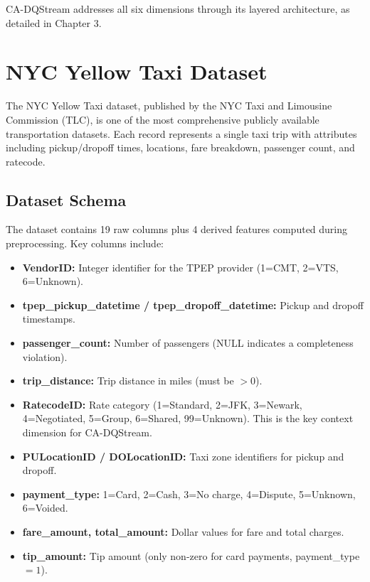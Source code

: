 CA-DQStream addresses all six dimensions through its layered architecture, as detailed in Chapter 3.

\section{NYC Yellow Taxi Dataset}

The NYC Yellow Taxi dataset, published by the NYC Taxi and Limousine Commission (TLC), is one of the most comprehensive publicly available transportation datasets. Each record represents a single taxi trip with attributes including pickup/dropoff times, locations, fare breakdown, passenger count, and ratecode.

\subsection{Dataset Schema}

The dataset contains 19 raw columns plus 4 derived features computed during preprocessing. Key columns include:

\begin{itemize}
    \item \textbf{VendorID:} Integer identifier for the TPEP provider (1=CMT, 2=VTS, 6=Unknown).
    \item \textbf{tpep\_pickup\_datetime / tpep\_dropoff\_datetime:} Pickup and dropoff timestamps.
    \item \textbf{passenger\_count:} Number of passengers (NULL indicates a completeness violation).
    \item \textbf{trip\_distance:} Trip distance in miles (must be $> 0$).
    \item \textbf{RatecodeID:} Rate category (1=Standard, 2=JFK, 3=Newark, 4=Negotiated, 5=Group, 6=Shared, 99=Unknown). This is the key context dimension for CA-DQStream.
    \item \textbf{PULocationID / DOLocationID:} Taxi zone identifiers for pickup and dropoff.
    \item \textbf{payment\_type:} 1=Card, 2=Cash, 3=No charge, 4=Dispute, 5=Unknown, 6=Voided.
    \item \textbf{fare\_amount, total\_amount:} Dollar values for fare and total charges.
    \item \textbf{tip\_amount:} Tip amount (only non-zero for card payments, payment\_type$=1$).
\end{itemize}

